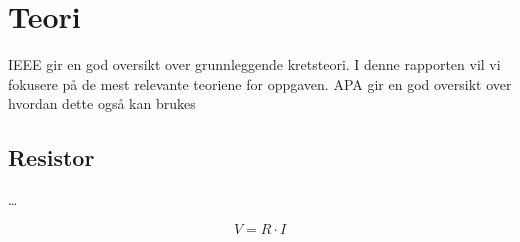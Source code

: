 \section{Teori}
IEEE \parencite{ieeeGuide} gir en god oversikt over grunnleggende kretsteori. 
I denne rapporten vil vi fokusere på de mest relevante teoriene for oppgaven. 
APA\cite{apaGuide} gir en god oversikt over hvordan dette også kan brukes

\subsection{Resistor}
\dots

\begin{equation}
V = R \cdot I
\end{equation}
